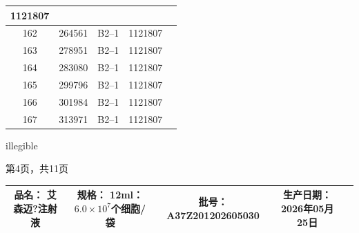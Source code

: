 \documentclass[UTF8,10pt,a4paper,fontset=fandol]{ctexart}
\newcommand{\fieldvalue}[1]{#1}
\newcommand{\handwritten}[1]{#1}
\begin{document}
\begin{center}
\begin{tabular}{|c|c|c|c|p{3.5cm}|}
\fieldvalue{1121807} & \\ \hline
162 &
\fieldvalue{264561} &
\fieldvalue{B2--1} &
\fieldvalue{1121807} & \\ \hline
163 &
\fieldvalue{278951} &
\fieldvalue{B2--1} &
\fieldvalue{1121807} & \\ \hline
164 &
\fieldvalue{283080} &
\fieldvalue{B2--1} &
\fieldvalue{1121807} & \\ \hline
165 &
\fieldvalue{299796} &
\fieldvalue{B2--1} &
\fieldvalue{1121807} & \\ \hline
166 &
\fieldvalue{301984} &
\fieldvalue{B2--1} &
\fieldvalue{1121807} & \\ \hline
167 &
\fieldvalue{313971} &
\fieldvalue{B2--1} &
\fieldvalue{1121807} & \\ \hline
\end{tabular}
\end{center}

\handwritten{illegible}

\begin{center}
第4页，共11页
\end{center}

\newpage

\begin{tabularx}{\textwidth}{|c|c|c|c|X|}
\hline
品名：
\fieldvalue{艾森迈?注射液}
&
规格：
\fieldvalue{12ml：$6.0\times 10^{7}$个细胞/袋}
&
批号：
\fieldvalue{A37Z201202605030}
&
生产日期：
\fieldvalue{2026年05月25日}
&
\\
\hline
\end{tabularx}
\end{document}
